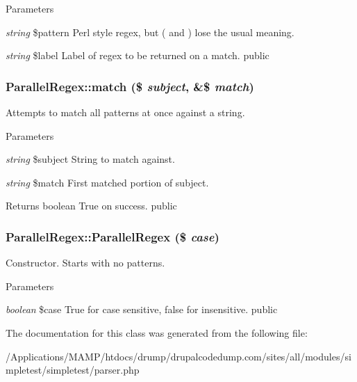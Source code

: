\begin{DoxyParams}{Parameters}
\item[{\em string}]\$pattern Perl style regex, but ( and ) lose the usual meaning. \item[{\em string}]\$label Label of regex to be returned on a match.  public \end{DoxyParams}
\hypertarget{class_parallel_regex_adfb969c27ae72a68ad84aeacbee0f873}{
\subsubsection[{match}]{\setlength{\rightskip}{0pt plus 5cm}ParallelRegex::match (\$ {\em subject}, \/  \&\$ {\em match})}}
\label{class_parallel_regex_adfb969c27ae72a68ad84aeacbee0f873}
Attempts to match all patterns at once against a string. 
\begin{DoxyParams}{Parameters}
\item[{\em string}]\$subject String to match against. \item[{\em string}]\$match First matched portion of subject. \end{DoxyParams}
\begin{DoxyReturn}{Returns}
boolean True on success.  public 
\end{DoxyReturn}
\hypertarget{class_parallel_regex_aea7360b4e60f1bfa202a51baf873a950}{
\subsubsection[{ParallelRegex}]{\setlength{\rightskip}{0pt plus 5cm}ParallelRegex::ParallelRegex (\$ {\em case})}}
\label{class_parallel_regex_aea7360b4e60f1bfa202a51baf873a950}
Constructor. Starts with no patterns. 
\begin{DoxyParams}{Parameters}
\item[{\em boolean}]\$case True for case sensitive, false for insensitive.  public \end{DoxyParams}


The documentation for this class was generated from the following file:\begin{DoxyCompactItemize}
\item 
/Applications/MAMP/htdocs/drump/drupalcodedump.com/sites/all/modules/simpletest/simpletest/parser.php\end{DoxyCompactItemize}
